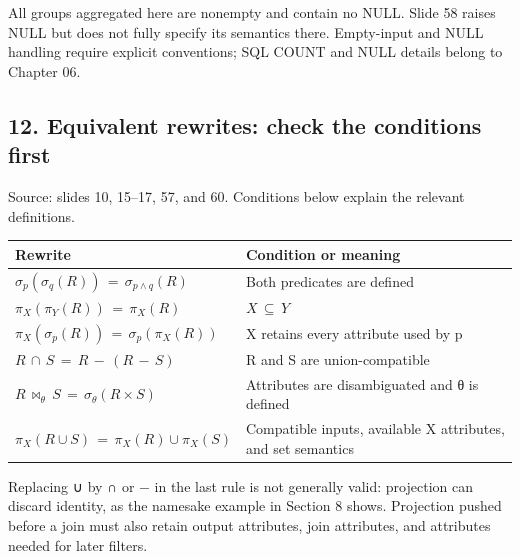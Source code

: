 All groups aggregated here are nonempty and contain no NULL. Slide 58 raises NULL but does not fully specify its semantics there. Empty-input and NULL handling require explicit conventions; SQL COUNT and NULL details belong to Chapter 06.

\subsection{12. Equivalent rewrites: check the conditions first}\label{05_relational_algebra_en-equivalent-rewrites-check-the-conditions-first}

Source: slides 10, 15--17, 57, and 60. Conditions below explain the relevant definitions.

\begin{longtable}[]{@{}
  >{\raggedright\arraybackslash}p{}
  >{\raggedright\arraybackslash}p{}@{}}
\toprule\noalign{}
\begin{minipage}[b]{\linewidth}\raggedright
Rewrite
\end{minipage} & \begin{minipage}[b]{\linewidth}\raggedright
Condition or meaning
\end{minipage} \\
\midrule\noalign{}
\endhead
\bottomrule\noalign{}
\endlastfoot
\(\sigma _{p}(\sigma _{q}(R))\,=\,\sigma _{p\land q}(R)\) & Both predicates are defined \\
\(\pi _{X}(\pi _{Y}(R))\,=\,\pi _{X}(R)\) & \(X\,\subseteq \,Y\) \\
\(\pi _{X}(\sigma _{p}(R))\,=\,\sigma _{p}(\pi _{X}(R))\) & X retains every attribute used by p \\
\(R\,\cap \,S\,=\,R\,- \,(R\,- \,S)\) & R and S are union-compatible \\
\(R\,\bowtie _\theta \,S\,=\,\sigma _\theta (R\times S)\) & Attributes are disambiguated and θ is defined \\
\(\pi _{X}(R\cup S)\,=\,\pi _{X}(R)\cup \pi _{X}(S)\) & Compatible inputs, available X attributes, and set semantics \\
\end{longtable}

Replacing ∪ by ∩ or − in the last rule is not generally valid: projection can discard identity, as the namesake example in Section 8 shows. Projection pushed before a join must also retain output attributes, join attributes, and attributes needed for later filters.

